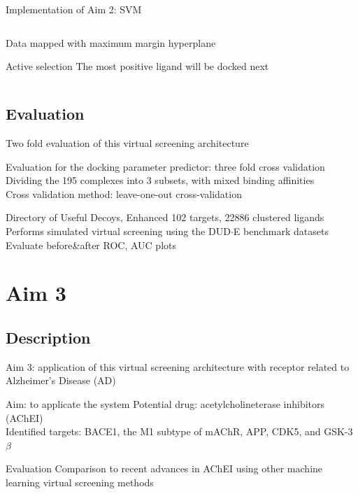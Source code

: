 \begin{frame}{Implementation of Aim 2: SVM}
\begin{columns}[T]
\begin{column}{0.45\textwidth}
 {\scriptsize Data mapped with maximum margin hyperplane \footnotemark[1]}
  \begin{block}{Active selection}
 The most positive ligand will be docked next
 \end{block}
\end{column}
\end{columns}
\end{frame}

\subsection{Evaluation}
\begin{frame}{Two fold evaluation of this virtual screening architecture}
\begin{block}{Evaluation for the docking parameter predictor: three fold cross validation}
Dividing the 195 complexes into 3 subsets, with mixed binding affinities\\
Cross validation method: leave-one-out cross-validation
\end{block}
\begin{block}{Directory of Useful Decoys, Enhanced}
102 targets, 22886 clustered ligands\\
Performs simulated virtual screening using the DUD$\cdot$E benchmark datasets\\
Evaluate before\&after ROC, AUC plots 
\end{block}
\end{frame}


\section{Aim 3}
\subsection{Description}
\begin{frame}{Aim 3: application of this virtual screening architecture with receptor related to Alzheimer's Disease (AD)}

\begin{block}{Aim: to applicate the system}
Potential drug: acetylcholineterase inhibitors (AChEI)\\
Identified targets: BACE1, the M1 subtype of mAChR, APP, CDK5, and GSK-3$\beta$
\end{block}

\begin{block}{Evaluation}
Comparison to recent advances in AChEI using other machine learning virtual screening methods
\end{block}


\end{frame}








